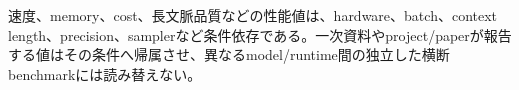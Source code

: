 \begin{claimboundary}
速度、memory、cost、長文脈品質などの性能値は、hardware、batch、context length、precision、samplerなど条件依存である。一次資料やproject/paperが報告する値はその条件へ帰属させ、異なるmodel/runtime間の独立した横断benchmarkには読み替えない。\autocite{src-3aa7f9dab810}
\end{claimboundary}
